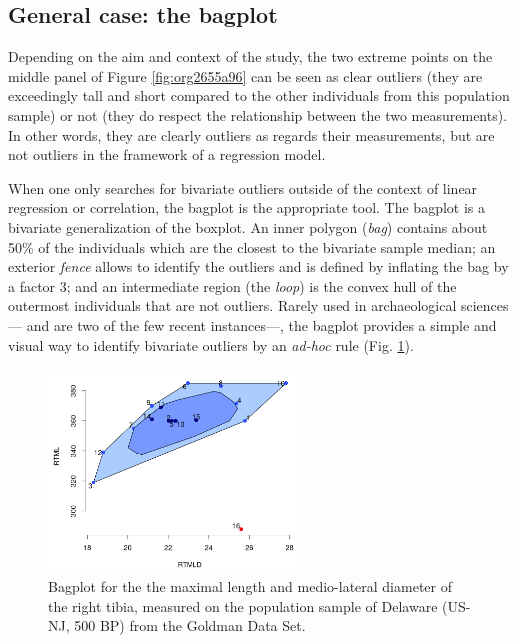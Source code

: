 \documentclass[review, 3p]{elsarticle}
\begin{document}
\subsection{General case: the bagplot}
\label{sec:org10fb522}
Depending on the aim and context of the study, the two extreme points on the middle panel of Figure \ref{fig:org2655a96} can be seen as clear outliers (they are exceedingly tall and short compared to the other individuals from this population sample) or not (they do respect the relationship between the two measurements). In other words, they are clearly outliers as regards their measurements, but are not outliers in the framework of a regression model.

When one only searches for bivariate outliers outside of the context of linear regression or correlation, the bagplot \citep{rousseeuw1999_BagplotBivariateBoxplot} is the appropriate tool. The bagplot is a bivariate generalization of the boxplot. An inner polygon (\emph{bag}) contains about 50\% of the individuals which are the closest to the bivariate sample median; an exterior \emph{fence} allows to identify the outliers and is defined by inflating the bag by a factor 3; and an intermediate region (the \emph{loop}) is the convex hull of the outermost individuals that are not outliers. Rarely used in archaeological sciences---\cite{oconnell2012_DietbodyOffsetHuman} and \cite{emery2018_MappingOriginsImperial} are two of the few recent instances---, the bagplot provides a simple and visual way to identify bivariate outliers by an \emph{ad-hoc} rule (Fig. \ref{fig:org501e243}).

\begin{figure}[htbp]
\centering
\includegraphics[width=0.6\textwidth]{figures/bagplot.png}
\caption{\label{fig:org501e243}Bagplot for the the maximal length and medio-lateral diameter of the right tibia, measured on the population sample of Delaware (US-NJ, 500 BP) from the Goldman Data Set.}
\end{figure}
\end{document}
